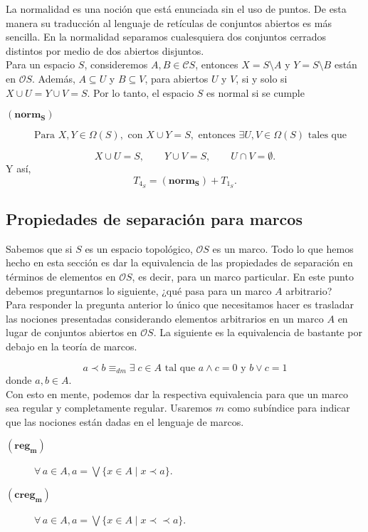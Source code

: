 La normalidad es una noción que está enunciada sin el uso de puntos. De esta manera su traducción al lenguaje de retículas de conjuntos abiertos es más sencilla. En la normalidad separamos cualesquiera dos conjuntos cerrados distintos por medio de dos abiertos disjuntos.\\

Para un espacio $S$, consideremos $A, B \in \mathcal{C}S$, entonces $X=S\setminus A$ y $Y=S\setminus B$ están en $\mathcal{O}S$. Además, $A\subseteq U$ y $B\subseteq V$, para abiertos $U$ y $V$, si y solo si $X\cup U= Y\cup V=S$. Por lo tanto, el espacio $S$ es normal si se cumple

\begin{description}
\item[$(\mathbf{norm_S})$] $\mbox{Para } X, Y\in \Omega(S), \mbox{ con } X\cup Y=S, \mbox{ entonces } \exists U, V\in \Omega(S) \mbox{ tales que}$
\end{description}
\[
X\cup U=S, \qquad Y\cup V=S,\qquad U\cap V=\emptyset.
\]
Y así, 
\[
T_{4_S}=(\mathbf{norm_S})+T_{1_S}.
\]

\subsection{Propiedades de separación para marcos}

Sabemos que si $S$ es un espacio topológico, $\mathcal{O}S$ es un marco. Todo lo que hemos hecho en esta sección es dar la equivalencia de las propiedades de separación en términos de elementos en $\mathcal{O}S$, es decir, para un marco particular. En este punto debemos preguntarnos lo siguiente, ¿qué pasa para un marco $A$ arbitrario?\\

\noindent
Para responder la pregunta anterior lo único que necesitamos hacer es trasladar las nociones presentadas considerando elementos arbitrarios en un marco $A$ en lugar de conjuntos abiertos en $\mathcal{O}S$. La siguiente es la equivalencia de bastante por debajo en la teoría de marcos.

\[
a\prec b \equiv_{dm} \exists \; c\in A \mbox{ tal que } a\wedge c=0 \mbox{ y } b\vee c=1
\]
donde $a, b\in A$.\\

Con esto en mente, podemos dar la respectiva equivalencia para que un marco sea regular y completamente regular.  Usaremos $m$ como subíndice para indicar que las nociones están dadas en el lenguaje de marcos.

\begin{description}
\item[$(\mathbf{reg_m})$] $\forall\, a\in A, a=\bigvee\{x\in A\mid x\prec a\}$.
\item[$(\mathbf{creg_m})$] $\forall\, a\in A, a=\bigvee\{x\in A\mid x\prec \prec a\}$.
\end{description}

